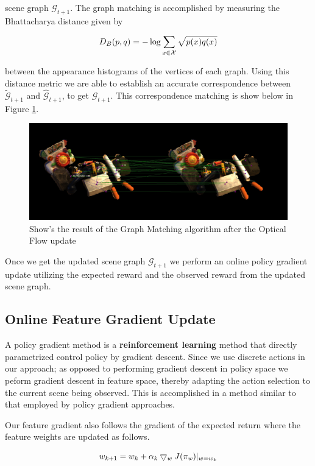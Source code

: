 scene graph $\mathcal{G}_{t+1}$. The graph matching is accomplished by measuring the Bhattacharya distance given by

\[
D_B(p,q) = -\log{\sum_{x\in\mathcal{X}}\sqrt{p(x)q(x)}}\\
\]

between the appearance histograms of the vertices of each graph. Using this distance metric we are able to establish an accurate correspondence between $\tilde{\mathcal{G}}_{t+1}$ and $\hat{\mathcal{G}}_{t+1}$, to get $\mathcal{G}_{t+1}$. This correspondence matching is show below in Figure \ref{fig:correspondence}.

\begin{figure}[ht!]
	\centering
	\includegraphics[width=\linewidth]{figs/correspondence.jpg}
	\caption{Show's the result of the Graph Matching algorithm after the Optical Flow update}
	\label{fig:correspondence}
\end{figure}


Once we get the updated scene graph $\mathcal{G}_{t+1}$ we perform an online policy gradient update utilizing the expected reward and the observed reward from the updated scene graph.

\subsection{Online Feature Gradient Update}
A policy gradient method is a {\bf reinforcement learning} method that directly parametrized control policy by gradient descent. Since we use discrete actions in our approach; as opposed to performing gradient descent in policy space we peform gradient descent in feature space, thereby adapting the action selection to the current scene being observed. This is accomplished in a method similar to that employed by policy gradient approaches.

Our feature gradient also follows the gradient of the expected return where the feature weights are updated as follows.

\[
w_{k+1} = w_k + \alpha_k\bigtriangledown_w{\it J(\pi_w)}|_{w=w_k}\\
\]


